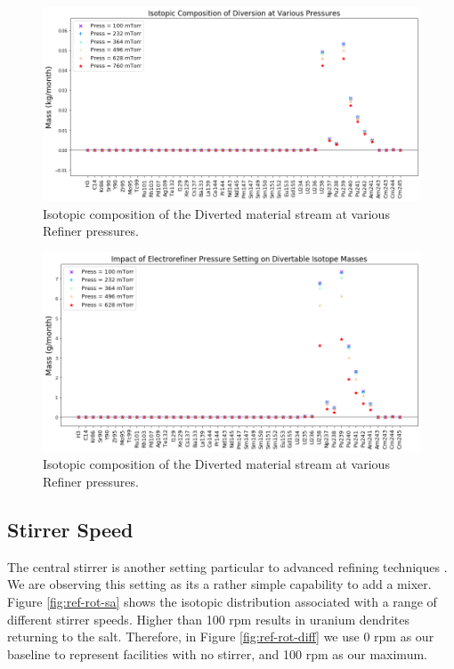 \begin{figure}
	\includegraphics[width=\linewidth]{images/pressure-sa-comp}
	\caption{Isotopic composition of the Diverted material stream at various Refiner pressures.}
	\label{fig:ref-press-sa}
\end{figure}

\begin{figure}
	\includegraphics[width=\linewidth]{images/pressure-sa-diff}
	\caption{Isotopic composition of the Diverted material stream at various Refiner pressures.}
	\label{fig:ref-press-diff}
\end{figure}

\subsection{Stirrer Speed}

The central stirrer is another setting particular to advanced refining techniques \cite{lee_advanced_2008}. We are observing this setting as its a rather simple capability to
add a mixer. Figure \ref{fig:ref-rot-sa} shows the isotopic distribution associated with a
range of different stirrer speeds. Higher than 100 rpm results in uranium dendrites returning
to the salt. Therefore, in Figure \ref{fig:ref-rot-diff} we use 0 rpm as our baseline to represent facilities with no stirrer, and 100 rpm as our maximum. 

